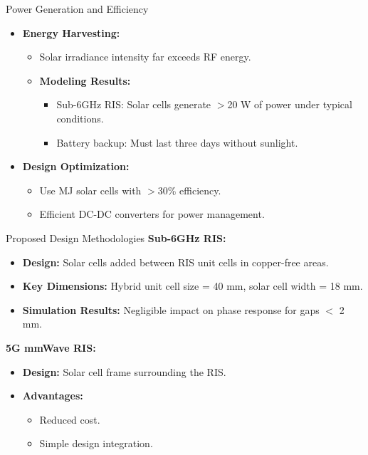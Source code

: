 \documentclass{beamer}
\let\olditem\item
\renewcommand\item{\olditem\justifying}
\begin{document}
	\begin{frame}{Power Generation and Efficiency}
		\begin{itemize}
			\item \textbf{Energy Harvesting:}
			\begin{itemize}
				\item Solar irradiance intensity far exceeds RF energy.
				\item \textbf{Modeling Results:}
				\begin{itemize}
					\item Sub-6GHz {RIS}: Solar cells generate $>$20 W of power under typical conditions.
					\item Battery backup: Must last three days without sunlight.
				\end{itemize}
			\end{itemize}
			\item \textbf{Design Optimization:}
			\begin{itemize}
				\item Use {MJ} solar cells with $>$30\% efficiency.
				\item Efficient {DC-DC} converters for power management.
			\end{itemize}
		\end{itemize}
	\end{frame}
	
	
	\begin{frame}{Proposed Design Methodologies}
		\textbf{Sub-6GHz RIS:}
		\begin{itemize}
			\item \textbf{Design:} Solar cells added between {RIS} unit cells in copper-free areas.
			\item \textbf{Key Dimensions:} Hybrid unit cell size = 40 mm, solar cell width = 18 mm.
			\item \textbf{Simulation Results:} Negligible impact on phase response for gaps $<$ 2 mm.
		\end{itemize}
		\textbf{5G mmWave RIS:}
		\begin{itemize}
			\item \textbf{Design:} Solar cell frame surrounding the {RIS}.
			\item \textbf{Advantages:}
			\begin{itemize}
				\item Reduced cost.
				\item Simple design integration.
			\end{itemize}
		\end{itemize}
	\end{frame}
	
\end{document}
